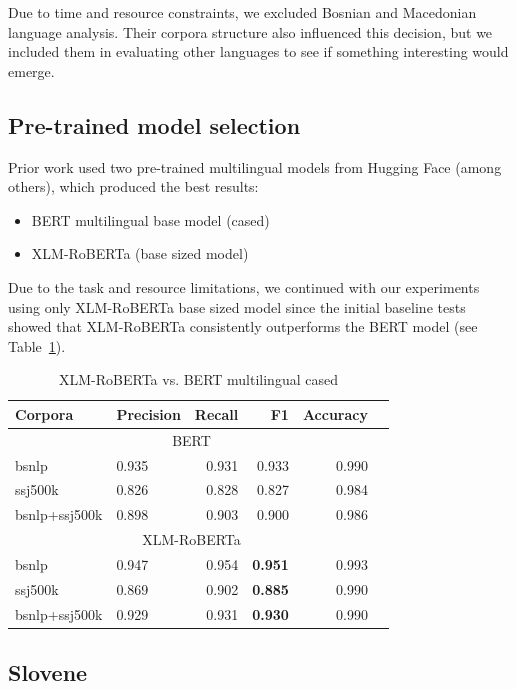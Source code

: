 \documentclass[sigconf]{acmart}
\begin{document}
Due to time and resource constraints, we excluded Bosnian and Macedonian language analysis.
Their corpora structure also influenced this decision, but we included them in evaluating other languages to see if something interesting would emerge.

\subsection{Pre-trained model selection}
\label{subsec:model-selection}
Prior work used two pre-trained multilingual models from Hugging Face (among others), which produced the best results:
\begin{itemize}
  \item BERT multilingual base model (cased)~\cite{DBLP:journals/corr/abs-1810-04805}
  \item XLM-RoBERTa (base sized model)~\cite{DBLP:journals/corr/abs-1911-02116}
\end{itemize}

Due to the task and resource limitations, we continued with our experiments using only XLM-RoBERTa base sized model
since the initial baseline tests showed that XLM-RoBERTa consistently outperforms the BERT model (see Table~\ref{tab:roberta_vs_bert}).

\begin{table}[H]
  \caption{XLM-RoBERTa vs. BERT multilingual cased}
  \label{tab:roberta_vs_bert}
  \begin{tabular}{llrrrr}
    \toprule
    Corpora&Precision&Recall&F1&Accuracy\\
    \midrule
    \multicolumn{5}{c}{BERT} \\
    \midrule
    bsnlp&0.935&0.931&0.933&0.990\\
    ssj500k&0.826&0.828&0.827&0.984\\
    bsnlp+ssj500k&0.898&0.903&0.900&0.986\\
    \midrule
    \multicolumn{5}{c}{XLM-RoBERTa} \\
    \midrule
    bsnlp&0.947&0.954&\textbf{0.951}&0.993\\
    ssj500k&0.869&0.902&\textbf{0.885}&0.990\\
    bsnlp+ssj500k&0.929&0.931&\textbf{0.930}&0.990\\
    \bottomrule
  \end{tabular}
\end{table}

\subsection{Slovene}
\label{subsec:slovene}
\end{document}
